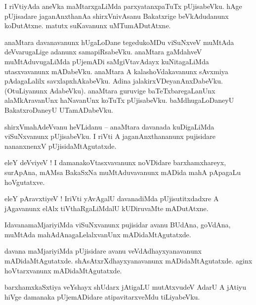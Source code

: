 \documentclass{article}
\begin{document}
\begin{mn}%
I riVtiyAda aneVka maMtarxgaLiMda parxyatanxpaTuTx pUjisabeVku. hAge pUjisadare jaganAnxthanAa 
shirxVnivAsanu Bakatxrige beVkAdudanunx koDutAtxne. matutx suKavanunx uMTumADutAtxne.
\end{mn}

\begin{mn}%
anaMtara davanavanunx hUgaLoDane tegedukoMDu viSuNxveV muMtAda deVvarugaLige adanunx 
samapiRsabeVku. anaMtara gaMdahveV muMtAduvugaLiMda pUjemADi saMgiVtavAdayx kuNitagaLiMda 
utasxvavanunx mADabeVku. anaMtara A kalashoVdakavanunx sAvxmiya pAdagaLalilx savxlapxhAkabeVku. 
Adina jalakirxVDeyanAnxDabeVku.(OtuLiyanunx AdabeVku). anaMtara guruvige baTeTxbaregaLanUnx 
alaMkAravanUnx haNavanUnx koTuTx pUjisabeVku. baMdhugaLoDaneyU BakatxroDaneyU UTamADabeVku.
\end{mn}

\begin{mn}%
shirxVmahAdeVvanu heVLidanu -- anaMtara davanada kuDigaLiMda viSuNxvanunx pUjisabeVku. I riVti A 
jaganAnxthananunx pujisidare nananxnenxV pUjisidaMtAgutatxde.
\end{mn}

\begin{mn}%
eleY deVviyeV ! I damanakoVtasxvavanunx noVDidare barxhamxhareyx, surApAna, mAMsa BakaSxNa 
muMtAduvavanunx mADida mahA pApagaLu hoVgutatxve.
\end{mn}

\begin{mn}%
eleY pAravxtiyeV ! IriVti yAvAgalU davanadiMda pUjisutitxdadxre A jAgavanunx elAlx tiVthaRgaLiMdalU 
kUDiruvaMte mADutAtxne.
\end{mn}

\begin{mn}%
IdavanamaMjariyiMda viSuNxvanunx pujisidar avanu BUdAna, goVdAna, muMtAda mahAdAnagaLelalxvanUnx 
mADidaMtAgutatxde.
\end{mn}

\begin{mn}%
davana maMjariyiMda pUjisidare avanu veVdAdhayxyanavanunx mADidaMtAgutatxde. 
shAsAtxrXdhayxyanavanunx mADidaMtAgutatxde. aginx hoVtarxvanunx mADidaMtAgutatxde.
\end{mn}

\begin{mn}%
barxhamxkaSxtiya veYshayx shUdarx jAtigaLU mutAtxvudeV AdarU A jAtiyu hiVge damanaka pUjemADidare 
atipavitarxveMdu tiLiyabeVku.
\end{mn}
\end{document}
